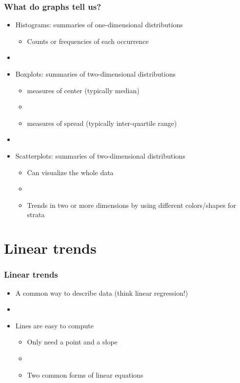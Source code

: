 \documentclass[11pt]{beamer}
\newcommand{\myframe}[1]{\begin{frame} \frametitle{#1}}
\begin{document}
\myframe{What do graphs tell us?}
\begin{itemize}
\item Histograms: summaries of one-dimensional distributions
\begin{itemize}
\item Counts or frequencies of each occurrence
\end{itemize}
\item[]
\item Boxplots: summaries of two-dimensional distributions
\begin{itemize}
\item measures of center (typically median)
\item[]
\item measures of spread (typically inter-quartile range)
\end{itemize}
\item[]
\item Scatterplots: summaries of two-dimensional distributions
\begin{itemize}
\item Can visualize the whole data
\item[]
\item Trends in two or more dimensions by using different colors/shapes for strata
\end{itemize}
\end{itemize}
\end{frame}

\section{Linear trends}
\myframe{Linear trends}
\begin{itemize}
\item A common way to describe data (think linear regression!)
\item[]
\item Lines are easy to compute
\begin{itemize}
\item Only need a point and a slope
\item[]
\item Two common forms of linear equations
\end{itemize}
\end{itemize}
\end{frame}
\end{document}
